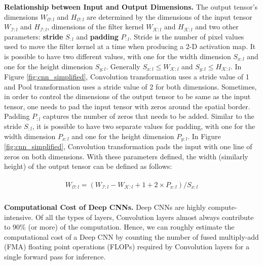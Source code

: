 \vspace{2mm}
\noindent \textbf{Relationship between Input and Output Dimensions.}
The output tensor's dimensions $W_{\mathcal{O}:l}$ and $H_{\mathcal{O}:l}$ are determined by the dimensions of the input tensor $W_{\mathcal{I}:l}$ and $H_{\mathcal{I}:l}$, dimensions of the filter kernel $W_{\mathcal{K}:l}$ and $H_{\mathcal{K}:l}$ and two other parameters: \textbf{stride} $S_{:l}$ and \textbf{padding} $P_{:l}$.
Stride is the number of pixel values used to move the filter kernel at a time when producing a 2-D activation map.
It is possible to have two different values, with one for the width dimension $S_{x:l}$ and one for the height dimension $S_{y:l}$.
Generally $S_{x:l} \leq W_{\mathcal{K}:l}$ and $S_{y:l} \leq H_{\mathcal{K}:l}$.
In Figure \ref{fig:cnn_simplified}, Convolution transformation uses a stride value of 1 and Pool transformation uses a stride value of 2 for both dimensions.
Sometimes, in order to control the dimensions of the output tensor to be same as the input tensor, one needs to pad the input tensor with zeros around the spatial border.
Padding $P_{:l}$ captures the number of zeros that needs to be added.
Similar to the stride $S_{:l}$, it is possible to have two separate values for padding, with one for the width dimension $P_{x:l}$ and one for the height dimension $P_{y:l}$.
In Figure \ref{fig:cnn_simplified}, Convolution transformation pads the input with one line of zeros on both dimensions.
With these parameters defined, the width (similarly height) of the output tensor can be defined as follows:

\begin{align}
\begin{split}
W_{\mathcal{O}:l} = (W_{\mathcal{I}:l} - W_{\mathcal{K}:l} + 1 + 2\times P_{x:l})/S_{x:l} \\
\end{split}
\end{align}

\vspace{2mm}
\noindent \textbf{Computational Cost of Deep CNNs.}
Deep CNNs are highly compute-intensive.
Of all the types of layers, Convolution layers almost always contribute to $90\%$ (or more) of the computation.
Hence, we can roughly estimate the computational cost of a Deep CNN by counting the number of fused multiply-add (FMA) floating point operations (FLOPs) required by Convolution layers for a single forward pass for inference.

